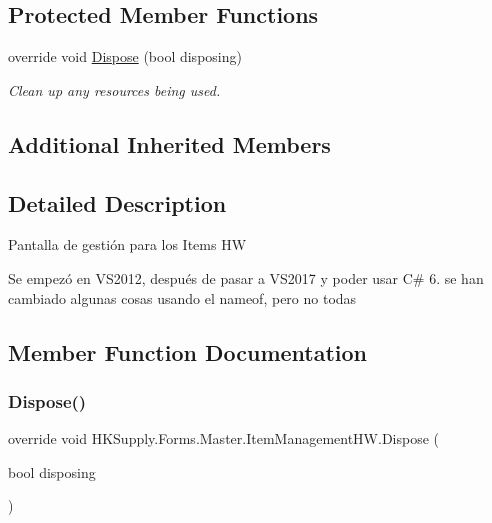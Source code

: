 \subsection*{Protected Member Functions}
\begin{DoxyCompactItemize}
\item 
override void \mbox{\hyperlink{class_h_k_supply_1_1_forms_1_1_master_1_1_item_management_h_w_a55131e9396a714e6197e6b7299772b20}{Dispose}} (bool disposing)
\begin{DoxyCompactList}\small\item\em Clean up any resources being used. \end{DoxyCompactList}\end{DoxyCompactItemize}
\subsection*{Additional Inherited Members}


\subsection{Detailed Description}
Pantalla de gestión para los Items HW 

Se empezó en V\+S2012, después de pasar a V\+S2017 y poder usar C\# 6. se han cambiado algunas cosas usando el nameof, pero no todas

\subsection{Member Function Documentation}
\mbox{\label{class_h_k_supply_1_1_forms_1_1_master_1_1_item_management_h_w_a55131e9396a714e6197e6b7299772b20}} 
\subsubsection{\texorpdfstring{Dispose()}{Dispose()}}
{\footnotesize\ttfamily override void H\+K\+Supply.\+Forms.\+Master.\+Item\+Management\+H\+W.\+Dispose (\begin{DoxyParamCaption}\item[{bool}]{disposing }\end{DoxyParamCaption})\hspace{0.3cm}{\ttfamily [protected]}}



